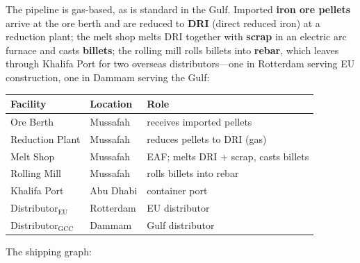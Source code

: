 \documentclass[11pt,a4paper]{article}
\theoremstyle{plain}
\theoremstyle{definition}
\theoremstyle{remark}
\begin{document}
The pipeline is gas-based, as is standard in the Gulf. Imported
\textbf{iron ore pellets} arrive at the ore berth and are reduced to
\textbf{DRI} (direct reduced iron) at a reduction plant; the melt
shop melts DRI together with \textbf{scrap} in an electric arc
furnace and casts \textbf{billets}; the rolling mill rolls billets
into \textbf{rebar}, which leaves through Khalifa Port for two
overseas distributors---one in Rotterdam serving EU construction,
one in Dammam serving the Gulf:

\begin{center}
\begin{tabular}{lll}
\toprule
Facility & Location & Role \\
\midrule
Ore Berth & Mussafah & receives imported pellets \\
Reduction Plant & Mussafah & reduces pellets to DRI (gas) \\
Melt Shop & Mussafah & EAF; melts DRI + scrap, casts billets \\
Rolling Mill & Mussafah & rolls billets into rebar \\
Khalifa Port & Abu Dhabi & container port \\
Distributor$_{\mathrm{EU}}$ & Rotterdam & EU distributor \\
Distributor$_{\mathrm{GCC}}$ & Dammam & Gulf distributor \\
\bottomrule
\end{tabular}
\end{center}

The shipping graph:

\begin{center}
\end{center}
\end{document}
